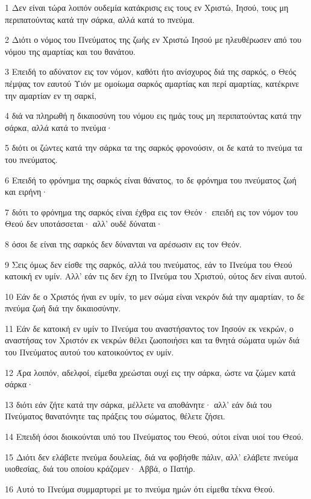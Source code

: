 \par 1 Δεν είναι τώρα λοιπόν ουδεμία κατάκρισις εις τους εν Χριστώ, Ιησού, τους μη περιπατούντας κατά την σάρκα, αλλά κατά το πνεύμα.
\par 2 Διότι ο νόμος του Πνεύματος της ζωής εν Χριστώ Ιησού με ηλευθέρωσεν από του νόμου της αμαρτίας και του θανάτου.
\par 3 Επειδή το αδύνατον εις τον νόμον, καθότι ήτο ανίσχυρος διά της σαρκός, ο Θεός πέμψας τον εαυτού Υιόν με ομοίωμα σαρκός αμαρτίας και περί αμαρτίας, κατέκρινε την αμαρτίαν εν τη σαρκί,
\par 4 διά να πληρωθή η δικαιοσύνη του νόμου εις ημάς τους μη περιπατούντας κατά την σάρκα, αλλά κατά το πνεύμα·
\par 5 διότι οι ζώντες κατά την σάρκα τα της σαρκός φρονούσιν, οι δε κατά το πνεύμα τα του πνεύματος.
\par 6 Επειδή το φρόνημα της σαρκός είναι θάνατος, το δε φρόνημα του πνεύματος ζωή και ειρήνη·
\par 7 διότι το φρόνημα της σαρκός είναι έχθρα εις τον Θεόν· επειδή εις τον νόμον του Θεού δεν υποτάσσεται· αλλ' ουδέ δύναται·
\par 8 όσοι δε είναι της σαρκός δεν δύνανται να αρέσωσιν εις τον Θεόν.
\par 9 Σεις όμως δεν είσθε της σαρκός, αλλά του πνεύματος, εάν το Πνεύμα του Θεού κατοική εν υμίν. Αλλ' εάν τις δεν έχη το Πνεύμα του Χριστού, ούτος δεν είναι αυτού.
\par 10 Εάν δε ο Χριστός ήναι εν υμίν, το μεν σώμα είναι νεκρόν διά την αμαρτίαν, το δε πνεύμα ζωή διά την δικαιοσύνην.
\par 11 Εάν δε κατοική εν υμίν το Πνεύμα του αναστήσαντος τον Ιησούν εκ νεκρών, ο αναστήσας τον Χριστόν εκ νεκρών θέλει ζωοποιήσει και τα θνητά σώματα υμών διά του Πνεύματος αυτού του κατοικούντος εν υμίν.
\par 12 Άρα λοιπόν, αδελφοί, είμεθα χρεώσται ουχί εις την σάρκα, ώστε να ζώμεν κατά σάρκα·
\par 13 διότι εάν ζήτε κατά την σάρκα, μέλλετε να αποθάνητε· αλλ' εάν διά του Πνεύματος θανατόνητε τας πράξεις του σώματος, θέλετε ζήσει.
\par 14 Επειδή όσοι διοικούνται υπό του Πνεύματος του Θεού, ούτοι είναι υιοί του Θεού.
\par 15 Διότι δεν ελάβετε πνεύμα δουλείας, διά να φοβήσθε πάλιν, αλλ' ελάβετε πνεύμα υιοθεσίας, διά του οποίου κράζομεν· Αββά, ο Πατήρ.
\par 16 Αυτό το Πνεύμα συμμαρτυρεί με το πνεύμα ημών ότι είμεθα τέκνα Θεού.
